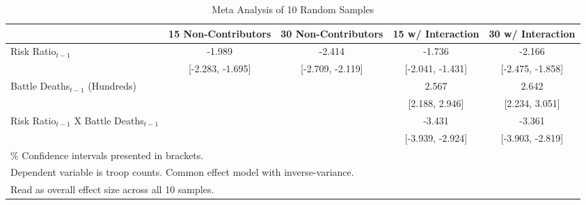 \begin{table}[htbp]\centering
\fontsize{9.5}{9.5}\selectfont
\def\sym#1{\ifmmode^{#1}\else\(^{#1}\)\fi}
\caption{Meta Analysis of 10 Random Samples \label{Table 9}}
\begin{tabular}{l*{4}{c}}
\hline\hline
        &\multicolumn{1}{c}{15 Non-Contributors}     &\multicolumn{1}{c}{30 Non-Contributors}  & \multicolumn{1}{c}{15 w/ Interaction}  & \multicolumn{1}{c}{30 w/ Interaction}      \\
\hline
Risk Ratio$_{t-1}$ & -1.989           &      -2.414        &    -1.736           &    -2.166   \\
 &                 [-2.283, -1.695]   &   [-2.709, -2.119] &  [-2.041, -1.431]   &  [-2.475, -1.858]  \\
[0.25em]
Battle Deaths$_{t-1}$ (Hundreds)  &         &              &          2.567       &  2.642  \\
        &                           &                      &    [2.188, 2.946]    & [2.234, 3.051] \\
[0.25em]
Risk Ratio$_{t-1}$ X Battle Deaths$_{t-1}$  &   &    &     -3.431          &        -3.361 \\
                    &               &                &   [-3.939, -2.924]  &   [-3.903, -2.819] \\ 
\hline\hline
\multicolumn{5}{l}{\fontsize{8}{8}\selectfont 95\% Confidence intervals presented in brackets.}\\
\multicolumn{5}{l}{\fontsize{8}{8}\selectfont Dependent variable is troop counts. Common effect model with inverse-variance.}\\
\multicolumn{5}{l}{\fontsize{8}{8}\selectfont Read as overall effect size across all 10 samples.}
\end{tabular}
\vspace{-3em}
\end{table}